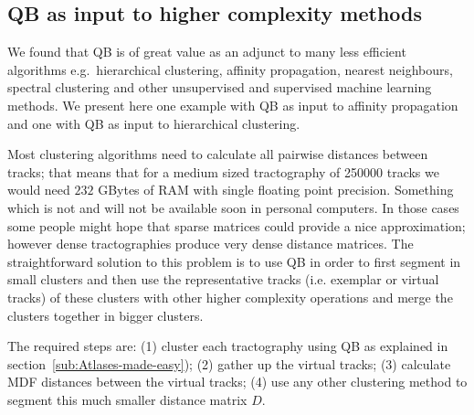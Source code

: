 \documentclass{bioinfo}
\begin{document}

\subsection{QB as input to higher complexity methods\label{sub:QB_as_input}}

We found that QB is of great value as an adjunct to many less efficient
algorithms e.g.~hierarchical clustering, affinity propagation, nearest
neighbours, spectral clustering and other unsupervised and supervised
machine learning methods. We present here one example with QB as input to
affinity propagation and one with QB as input to hierarchical
clustering.

Most clustering algorithms need to calculate all pairwise distances
between tracks; that means that for a medium sized tractography of
\num{250000} tracks we would need $232$ GBytes of RAM with single floating
point precision. Something which is not and will not be available soon
in personal computers. In those cases some people might hope that sparse
matrices could provide a nice approximation; however dense
tractographies produce very dense distance matrices. The straightforward
solution to this problem is to use QB in order to first segment in small
clusters and then use the representative tracks (i.e. exemplar or virtual
tracks) of these clusters with other higher complexity operations and merge the
clusters together in bigger clusters.

The required steps are: (1) cluster each tractography using QB as
explained in section~\ref{sub:Atlases-made-easy}); (2) gather up the
virtual tracks; (3) calculate MDF distances between the virtual tracks;
(4) use any other clustering method to segment this much smaller
distance matrix $D$.
\end{document}
